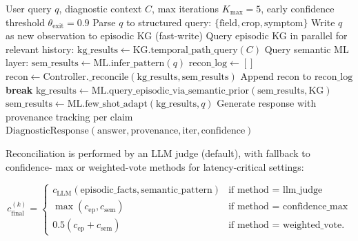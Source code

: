 \documentclass{article}
\begin{document}
\begin{algorithm}[h]
\caption{Iterative Bidirectional Diagnostic Protocol}
\label{alg:diagnose}
\begin{algorithmic}[1]
\Require User query $q$, diagnostic context $C$, max iterations $K_{\max}=5$,
        early confidence threshold $\theta_{\text{exit}}=0.9$
\State Parse $q$ to structured query: $\{\text{field}, \text{crop}, \text{symptom}\}$
\State Write $q$ as new observation to episodic KG (fast-write)
\State Query episodic KG in parallel for relevant history: $\text{kg\_results} \gets
        \text{KG.temporal\_path\_query}(C)$
\State Query semantic ML layer: $\text{sem\_results} \gets
        \text{ML.infer\_pattern}(q)$
\State $\text{recon\_log} \gets []$
  \State $\text{recon} \gets \text{Controller.\_reconcile}(\text{kg\_results},
          \text{sem\_results})$
  \State Append $\text{recon}$ to $\text{recon\_log}$
    \State \textbf{break} 
  \EndIf
    \State $\text{kg\_results} \gets \text{ML.query\_episodic\_via\_semantic\_prior}
            (\text{sem\_results}, \text{KG})$ 
  \EndIf
    \State $\text{sem\_results} \gets \text{ML.few\_shot\_adapt}
            (\text{kg\_results}, q)$ 
  \EndIf
\EndFor
\State Generate response with provenance tracking per claim
\State \Return $\text{DiagnosticResponse}(\text{answer}, \text{provenance},
        \text{iter}, \text{confidence})$
\end{algorithmic}
\end{algorithm}

Reconciliation is performed by an LLM judge (default), with fallback to confidence-
max or weighted-vote methods for latency-critical settings:

\begin{equation}
c_{\text{final}}^{(k)} = \begin{cases}
c_{\text{LLM}}(\text{episodic\_facts}, \text{semantic\_pattern}) &
\text{if method = llm\_judge} \\
\max(c_{\text{ep}}, c_{\text{sem}}) & \text{if method = confidence\_max} \\
0.5(c_{\text{ep}} + c_{\text{sem}}) & \text{if method = weighted\_vote}.
\end{cases}
\label{eq:reconciliation}
\end{equation}
\end{document}
